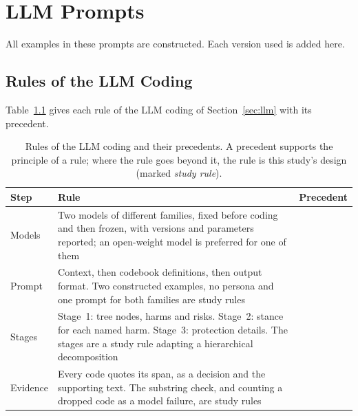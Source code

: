 \chapter{LLM Prompts}
\label{app:prompts}

All examples in these prompts are constructed. Each version used is added here.

\section{Rules of the LLM Coding}
\label{app:llm-rules}
Table~\ref{tab:llm-steps} gives each rule of the LLM coding of Section~\ref{sec:llm} with its
precedent.

\begin{table}[H]
\centering
\begin{singlespace}
\caption[Rules of the LLM coding and their precedents]{Rules of the LLM coding and their
precedents. A precedent supports the principle of a rule; where the rule goes beyond it, the
rule is this study's design (marked \emph{study rule}).}
\label{tab:llm-steps}
\footnotesize
\begin{tabularx}{\textwidth}{@{}>{\raggedright\arraybackslash}p{2.1cm}>{\raggedright\arraybackslash}X>{\raggedright\arraybackslash}p{3.6cm}@{}}
\toprule
\textbf{Step} & \textbf{Rule} & \textbf{Precedent} \\
\midrule
Models & Two models of different families, fixed before coding and then frozen, with versions and parameters reported; an open-weight model is preferred for one of them
  & \parencite{tornberg2024best} \\
\cmidrule[0.3pt]{2-3}
Prompt & Context, then codebook definitions, then output format. Two constructed examples, no persona and one prompt for both families are study rules
  & \parencite[\S4.2, pp.~3886--3888]{rodriguez2024llm}\parencite{tornberg2024best} \\
\cmidrule[0.3pt]{2-3}
Stages & Stage~1: tree nodes, harms and risks. Stage~2: stance for each named harm. Stage~3: protection details. The stages are a study rule adapting a hierarchical decomposition
  & \parencite[\S4.3]{harkous2018polisis} \\
\cmidrule[0.3pt]{2-3}
Evidence & Every code quotes its span, as a decision and the supporting text. The substring check, and counting a dropped code as a model failure, are study rules
  & \parencite[App.~B]{xie2025evaluating} \\

\end{tabularx}
\end{singlespace}
\end{table}
